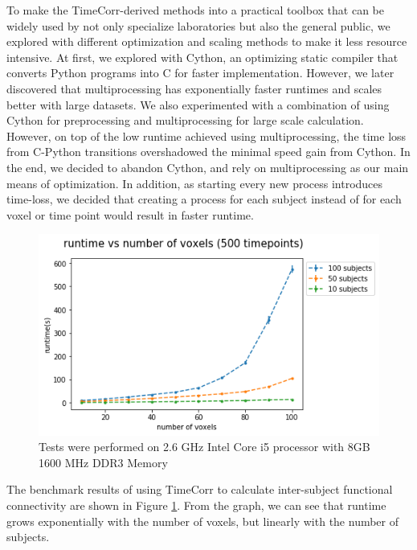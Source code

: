 \documentclass[11pt]{article}
\begin{document}
To make the TimeCorr-derived methods into a practical toolbox that can be widely used by not only specialize laboratories but also the general public, we explored with different optimization and scaling methods to make it less resource intensive. At first, we explored with Cython, an optimizing static compiler that converts Python programs into C for faster implementation. However, we later discovered that multiprocessing has exponentially faster runtimes and scales better with large datasets. We also experimented with a combination of using Cython for preprocessing and multiprocessing for large scale calculation. However, on top of the low runtime achieved using multiprocessing, the time loss from C-Python transitions overshadowed the minimal speed gain from Cython. In the end, we decided to abandon Cython, and rely on multiprocessing as our main means of optimization. In addition, as starting every new process introduces time-loss, we decided that creating a process for each subject instead of for each voxel or time point would result in faster runtime.

\begin{figure}[!htb]
\centering
\includegraphics[width=1\textwidth]{../figures/Benchmark/500timepoints.png}
Tests were performed on 2.6 GHz Intel Core i5 processor with 8GB 1600 MHz DDR3 Memory
\label{fig:benchmark}
\end{figure}

The benchmark results of using TimeCorr to calculate inter-subject functional connectivity are shown in Figure \ref{fig:benchmark}. From the graph, we can see that runtime grows exponentially with the number of voxels, but linearly with the number of subjects.

\clearpage
\newpage
\end{document}
